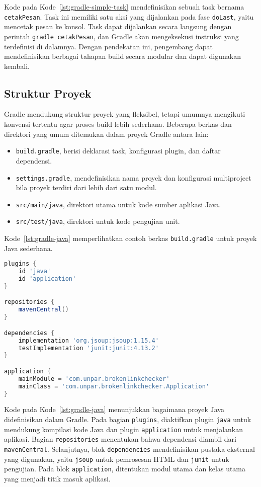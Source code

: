 Kode pada Kode~\ref{lst:gradle-simple-task} mendefinisikan sebuah task bernama \texttt{cetakPesan}. Task ini memiliki satu aksi yang dijalankan pada fase \texttt{doLast}, yaitu mencetak pesan ke konsol. Task dapat dijalankan secara langsung dengan perintah \texttt{gradle cetakPesan}, dan Gradle akan mengeksekusi instruksi yang terdefinisi di dalamnya. Dengan pendekatan ini, pengembang dapat mendefinisikan berbagai tahapan build secara modular dan dapat digunakan kembali.


\subsection{Struktur Proyek}
Gradle mendukung struktur proyek yang fleksibel, tetapi umumnya mengikuti konvensi tertentu agar proses build lebih sederhana. Beberapa berkas dan direktori yang umum ditemukan dalam proyek Gradle antara lain:  

\begin{itemize}
    \item \texttt{build.gradle}, berisi deklarasi task, konfigurasi plugin, dan daftar dependensi.
    \item \texttt{settings.gradle}, mendefinisikan nama proyek dan konfigurasi multiproject bila proyek terdiri dari lebih dari satu modul.
    \item \texttt{src/main/java}, direktori utama untuk kode sumber aplikasi Java.
    \item \texttt{src/test/java}, direktori untuk kode pengujian unit.
\end{itemize}

Kode~\ref{lst:gradle-java} memperlihatkan contoh berkas \texttt{build.gradle} untuk proyek Java sederhana.

\begin{lstlisting}[language=groovy, caption=Contoh berkas build.gradle untuk proyek Java, label=lst:gradle-java]
plugins {
    id 'java'
    id 'application'
}

repositories {
    mavenCentral()
}

dependencies {
    implementation 'org.jsoup:jsoup:1.15.4'
    testImplementation 'junit:junit:4.13.2'
}

application {
    mainModule = 'com.unpar.brokenlinkchecker'
    mainClass = 'com.unpar.brokenlinkchecker.Application'
}
\end{lstlisting}

Kode pada Kode~\ref{lst:gradle-java} menunjukkan bagaimana proyek Java didefinisikan dalam Gradle. Pada bagian \texttt{plugins}, diaktifkan plugin \texttt{java} untuk mendukung kompilasi kode Java dan plugin \texttt{application} untuk menjalankan aplikasi. Bagian \texttt{repositories} menentukan bahwa dependensi diambil dari \texttt{mavenCentral}. Selanjutnya, blok \texttt{dependencies} mendefinisikan pustaka eksternal yang digunakan, yaitu \texttt{jsoup} untuk pemrosesan HTML dan \texttt{junit} untuk pengujian. Pada blok \texttt{application}, ditentukan modul utama dan kelas utama yang menjadi titik masuk aplikasi.



